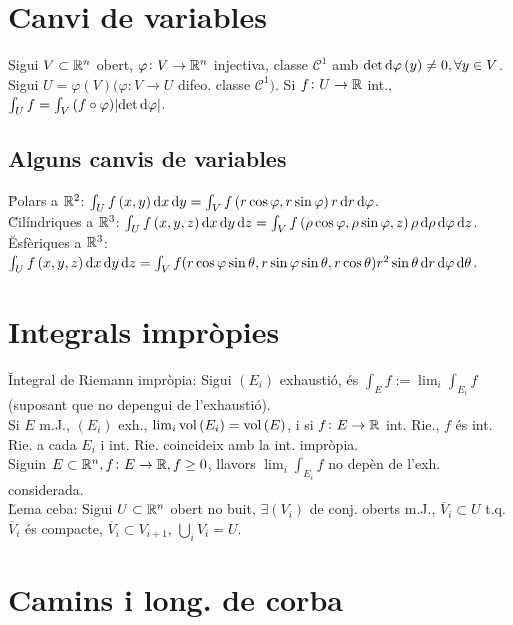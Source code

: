 \section{Canvi de variables}

\ci Sigui $V\subset\mathbb{R}^n$ obert, $\varphi\colon V\to\mathbb{R}^n$ injectiva, classe $\mathcal{C}^1$ amb $\det \dif \varphi\left( y \right) \neq 0, \forall y \in V$. Sigui $U = \varphi\left( V \right) (\varphi\colon V\to U$ difeo. classe $\mathcal{C}^1)$. Si $f\colon U\to \mathbb{R}$ int., $\int_U f = \int_V\left( f \circ \varphi \right)\abs{\det \dif \varphi}$.

\subsection{Alguns canvis de variables}
\u{Polars a $\mathbb{R}^2$}: $\int_U f\left( x,y \right) \dif x\dif y = \int_V f\left( r\cos\varphi, r\sin\varphi \right)r \dif r\dif \varphi$. \\
\u{Cilíndriques a $\mathbb{R}^3$}: $\int_U f\left( x,y,z \right) \dif x\dif y\dif z = \int_V f\left( \rho\cos\varphi, \rho\sin\varphi, z \right)\rho \dif \rho\dif \varphi\dif z$. \\
\u{Esfèriques a $\mathbb{R}^3$}: $\int_U f\left( x,y,z \right) \dif x\dif y\dif z = \int_V f ( r\cos\varphi\sin\theta, r\sin\varphi\sin\theta, r\cos\theta ) r^2\sin\theta \dif r\dif \varphi\dif \theta$.

\section{Integrals impròpies}

\u{Integral de Riemann impròpia}: Sigui $\left( E_i \right)$ exhaustió, \'es $\int_E f := \lim_i \int_{E_i} f$ (suposant que no depengui de l'exhaustió). \\
\ci Si $E$ m.J., $\left( E_i \right)$ exh., $\lim_i \operatorname{vol}\left( E_i \right) = \operatorname{vol} \left( E \right)$, i si $f\colon E\to\mathbb{R}$ int. Rie., $f$ \'es int. Rie. a cada $E_i$ i int. Rie. coincideix amb la int. impròpia. \\
\ci Siguin $E\subset\mathbb{R}^n, f\colon E\to \mathbb{R}, f \geq 0$, llavors $\lim_i\int_{E_i} f$ no depèn de l'exh. considerada. \\
\u{Lema ceba}: Sigui $U\subset\mathbb{R}^n$ obert no buit, $\exists (V_i)$ de conj. oberts m.J., $\overline{V}_i \subset U$ t.q. $\overline{V}_i$ \'es compacte, $\overline{V}_i \subset V_{i+1}, \, \bigcup_i V_i = U$.

\section{Camins i long. de corba}

